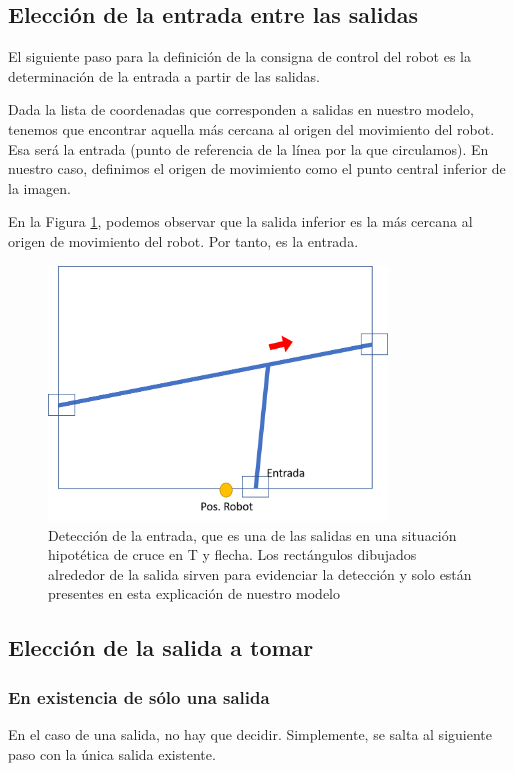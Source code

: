 \documentclass{article}
\begin{document}
    \subsection{Elección de la entrada entre las salidas}
        El siguiente paso para la definición de la consigna de control del robot es la determinación de la entrada a partir de las salidas.

        Dada la lista de coordenadas que corresponden a salidas en nuestro modelo, tenemos que encontrar aquella más cercana al origen del movimiento del robot. Esa será la entrada (punto de referencia de la línea por la que circulamos). En nuestro caso, definimos el origen de movimiento como el punto central inferior de la imagen.

        En la Figura \ref{fig:consigna3}, podemos observar que la salida inferior es la más cercana al origen de movimiento del robot. Por tanto, es la entrada.

        \begin{figure}[H]
            \centering
            \includegraphics[width=9cm]{figures/consigna3.png}
            \caption{Detección de la entrada, que es una de las salidas en una situación hipotética de cruce en T y flecha. Los rectángulos dibujados alrededor de la salida sirven para evidenciar la detección y solo están presentes en esta explicación de nuestro modelo}
            \label{fig:consigna3}
        \end{figure}


    \subsection{Elección de la salida a tomar}
        \subsubsection{En existencia de sólo una salida}
            En el caso de una salida, no hay que decidir. Simplemente, se salta al siguiente paso con la única salida existente.
\end{document}
